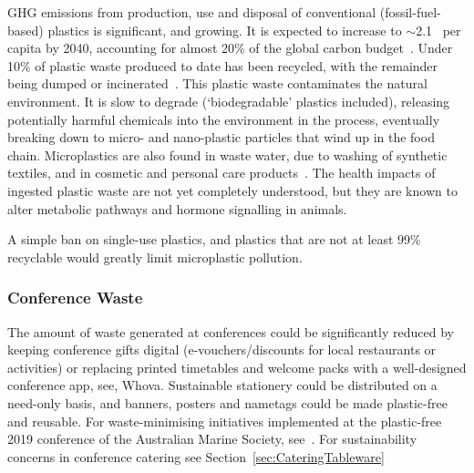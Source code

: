 \documentclass[../SustainableHEP.tex]{subfiles}
\begin{document}
GHG emissions from production, use and disposal of conventional (fossil-fuel-based) plastics is significant, and growing.  It is expected to increase to $\sim$2.1 \tCdOe\ per capita by 2040, accounting for almost 20\% of the global carbon budget~\cite{UNPollutionSolution}.  Under 10\% of plastic waste produced to date has been recycled, with the remainder being dumped or incinerated~\cite{UNPollutionSolution}.  This plastic waste contaminates the natural environment.  It is slow to degrade (`biodegradable' plastics included), releasing potentially harmful chemicals into the environment in the process, eventually breaking down to micro- and nano-plastic particles that wind up in the food chain.  Microplastics are also found in waste water, due to washing of synthetic textiles, and in cosmetic and personal care products~\cite{Microplastics}.  The health impacts of ingested plastic waste are not yet completely understood, but they are known to alter metabolic pathways and hormone signalling in animals.

A simple ban on single-use plastics, and plastics that are not at least 99\% recyclable would greatly limit microplastic pollution. 

\subsubsection{Conference Waste\label{sec:ConferenceWaste}}

The amount of waste generated at conferences could be significantly reduced by \eg keeping conference gifts digital (e-vouchers/discounts for local restaurants or activities) or replacing printed timetables and welcome packs with a well-designed conference app, see, \eg Whova\cite{Whova}.    Sustainable stationery could be distributed on a need-only basis, and banners, posters and nametags could be made plastic-free and reusable.  For waste-minimising initiatives implemented at the plastic-free 2019 conference of the Australian Marine Society, see~.  For sustainability concerns in conference catering see Section~\ref{sec:CateringTableware}
\end{document}
